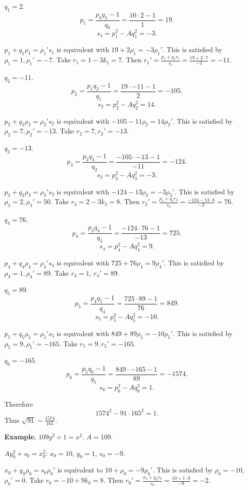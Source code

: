 \documentclass{article}
\theoremstyle{definition}
\begin{document}
$q_1=2$.
\[
p_1 = \frac{p_0q_1-1}{q_0} = \frac{10 \cdot 2 - 1}{1} = 19.
\]
\[
s_1 = p_1^2 - Aq_1^2 = -3.
\]

$p_1+q_1\rho_1=\rho_1's_1$ is equivalent with
$19+2\rho_1=-3\rho_1'$. This is satisfied by
$\rho_1=1, \rho_1'=-7$.
Take $r_1 = 1 - 3k_1 = 7$. 
Then $r_1' = \frac{p_1+q_1r_1}{s_1}
=\frac{19 + 2 \cdot 7}{-3} = -11$.

$q_2=-11$.
\[
p_2 = \frac{p_1q_2-1}{q_1} = \frac{19 \cdot -11-1}{2} = -105.
\]
\[
s_2 = p_2^2 - Aq_2^2 = 14.
\]

$p_2+q_2\rho_2=\rho_2's_2$
is equivalent with 
$-105-11\rho_2 = 14 \rho_2'$.  
This is satisfied by
$\rho_2=7, \rho_2'=-13$.
Take $r_2=7, r_2'=-13$.

$q_3=-13$.
\[
p_3 = \frac{p_2q_3-1}{q_2} = \frac{-105 \cdot -13 - 1}{-11} = -124.
\]
\[
s_3 = p_3^2-Aq_3^2 = -3.
\]

$p_3+q_3\rho_3=\rho_3's_3$ 
is equivalent with
$-124-13\rho_3 = -3\rho_3'$.
This is satisfied by $\rho_3=2, \rho_3'=50$.
Take 
$r_3 = 2 - 3k_3 = 8$. Then
$r_3'=\frac{p_3+q_3r_3}{s_3} = \frac{-124 - 13 \cdot 8}{-3} = 76$.

$q_4=76$.
\[
p_4 = \frac{p_3q_4-1}{q_3}
=\frac{-124 \cdot 76-1}{-13} = 725.
\]
\[
s_4 = p_4^2-Aq_4^2 = 9.
\]

$p_4+q_4\rho_4=\rho_4's_4$ 
is equivalent with
$725 + 76\rho_4 = 9\rho_4'$.
This is satisfied by $\rho_4=1, \rho_4'=89$.
Take $r_4 = 1$, $r_4'=89$.

$q_5=89$.
\[
p_5 =  \frac{p_4q_5-1}{q_4}
=\frac{725 \cdot 89 -1}{76} = 849.
\]
\[
s_5 = p_5^2 - Aq_5^2 = -10.
\]

$p_5+q_5\rho_5=\rho_5's_5$ 
is equivalent with
$849+89\rho_5 = -10\rho_5'$.
This is satisfied by 
$\rho_5=9, \rho_5'=-165$.
Take $r_5=9, r_5'=-165$.

$q_6=-165$.
\[
p_6 =  \frac{p_5q_6-1}{q_5} = \frac{849 \cdot -165-1}{89} = -1574.
\]
\[
s_6 = p_6^2 - Aq_6^2 = 1.
\]

Therefore
\[
1574^2 - 91 \cdot 165^2 = 1.
\]
Thus $\sqrt{91} \sim \frac{1574}{165}$. 




\textbf{Example.} $109y^2+1=x^2$.
$A=109$.

$Ay_0^2+s_0=x_0^2$:
$x_0=10$, $y_0=1$, $s_0=-9$. 

$x_0+y_0 \rho_0 = s_0 \rho_0'$ is equivalent to
$10 +\rho_0= - 9\rho_0'$. This is satisfied by
$\rho_0=-10$, $\rho_0'=0$.
Take $r_0 = -10 + 9k_0 = 8$. 
Then $r_0'= \frac{x_0+y_0r_0}{s_0}=
\frac{10+1 \cdot 8}{-9} = -2$.
\end{document}
